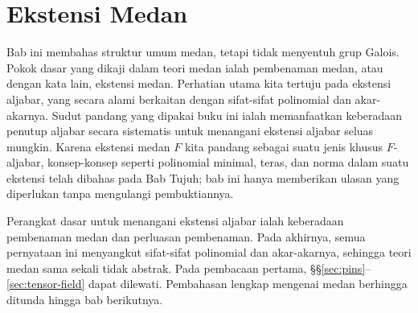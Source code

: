 
\chapter{Ekstensi Medan}\label{sec:field-ext}
Bab ini membahas struktur umum medan, tetapi tidak menyentuh grup Galois. Pokok dasar yang dikaji dalam teori medan ialah pembenaman medan, atau dengan kata lain, ekstensi medan. Perhatian utama kita tertuju pada ekstensi aljabar, yang secara alami berkaitan dengan sifat-sifat polinomial dan akar-akarnya. Sudut pandang yang dipakai buku ini ialah memanfaatkan keberadaan penutup aljabar secara sistematis untuk menangani ekstensi aljabar seluas mungkin. Karena ekstensi medan $F$ kita pandang sebagai suatu jenis khusus $F$-aljabar, konsep-konsep seperti polinomial minimal, teras, dan norma dalam suatu ekstensi telah dibahas pada Bab Tujuh; bab ini hanya memberikan ulasan yang diperlukan tanpa mengulangi pembuktiannya.

\begin{wenxintishi}
	Perangkat dasar untuk menangani ekstensi aljabar ialah keberadaan pembenaman medan dan perluasan pembenaman. Pada akhirnya, semua pernyataan ini menyangkut sifat-sifat polinomial dan akar-akarnya, sehingga teori medan sama sekali tidak abstrak. Pada pembacaan pertama, \S\S\ref{sec:pins}--\ref{sec:tensor-field} dapat dilewati. Pembahasan lengkap mengenai medan berhingga ditunda hingga bab berikutnya.
\end{wenxintishi}

